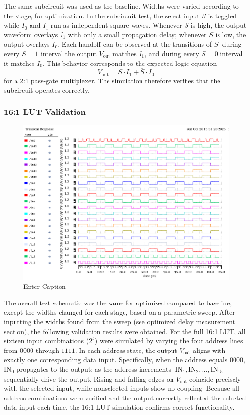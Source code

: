 \documentclass[12pt]{article}
\begin{document}
The same subcircuit was used as the baseline. Widths were varied according to the stage, for optimization. In the subcircuit test, the select input \( S \) is toggled while \( I_0 \) and \( I_1 \) run as independent square waves. 
Whenever \( S \) is high, the output waveform overlays \( I_1 \) with only a small propagation delay; whenever \( S \) is low, the output overlays \( I_0 \). 
Each handoff can be observed at the transitions of \( S \): during every \( S=1 \) interval the output \( V_{\text{out}} \) matches \( I_1 \), and during every \( S=0 \) interval it matches \( I_0 \). 
This behavior corresponds to the expected logic equation 
\[
V_{\text{out}} = S \cdot I_1 + \overline{S} \cdot I_0
\]
for a 2:1 pass-gate multiplexer. 
The simulation therefore verifies that the subcircuit operates correctly.

\subsubsection*{16:1 LUT Validation}
\begin{figure}[H]
    \centering
    \includegraphics[width=0.5\linewidth]{writeup//figures/lut_opt_validation_sim_updated.png}
    \caption{Enter Caption}
\end{figure}
The overall test schematic was the same for optimized compared to baseline, except the widths changed for each stage, based on a parametric sweep. After inputting the widths found from the sweep (see optimized delay measurement section), the following validation results were obtained.  For the full 16:1 LUT, all sixteen input combinations (\(2^4\)) were simulated by varying the four address lines from \(0000\) through \(1111\). 
In each address state, the output \(V_{\text{out}}\) aligns with exactly one corresponding data input. 
Specifically, when the address equals \(0000\), \(\text{IN}_0\) propagates to the output; as the address increments, \(\text{IN}_1, \text{IN}_2, \ldots, \text{IN}_{15}\) sequentially drive the output. 
Rising and falling edges on \(V_{\text{out}}\) coincide precisely with the selected input, while nonselected inputs show no coupling. 
Because all address combinations were verified and the output correctly reflected the selected data input each time, the 16:1 LUT simulation confirms correct functionality.
\end{document}
